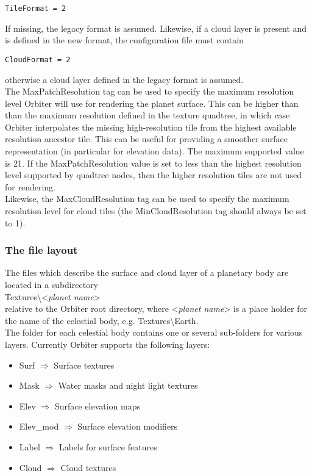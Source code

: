 \documentclass[Orbiter Developer Manual.tex]{subfiles}
\begin{document}
\begin{lstlisting}[language=OSFS]
TileFormat = 2
\end{lstlisting}

\noindent
If missing, the legacy format is assumed. Likewise, if a cloud layer is present and is defined in the new format, the configuration file must contain

\begin{lstlisting}[language=OSFS]
CloudFormat = 2
\end{lstlisting}

\noindent
otherwise a cloud layer defined in the legacy format is assumed.\\
The MaxPatchResolution tag can be used to specify the maximum resolution level Orbiter will use for rendering the planet surface. This can be higher than than the maximum resolution defined in the texture quadtree, in which case Orbiter interpolates the missing high-resolution tile from the highest available resolution ancestor tile. This can be useful for providing a smoother surface representation (in particular for elevation data). The maximum supported value is 21. If the MaxPatchResolution value is set to less than the highest resolution level supported by quadtree nodes, then the higher resolution tiles are not used for rendering.\\
Likewise, the MaxCloudResolution tag can be used to specify the maximum resolution level for cloud tiles (the MinCloudResolution tag should always be set to 1).


\subsubsection{The file layout}
\label{sssec:tile_file_layout}
The files which describe the surface and cloud layer of a planetary body are located in a subdirectory\\
\indent Textures\textbackslash <\textit{planet name}>\\
relative to the Orbiter root directory, where <\textit{planet name}> is a place holder for the name of the celestial body, e.g. Textures\textbackslash Earth.\\
The folder for each celestial body contains one or several sub-folders for various layers. Currently Orbiter supports the following layers:

\begin{itemize}
\item Surf $\Rightarrow$ Surface textures
\item Mask $\Rightarrow$ Water masks and night light textures
\item Elev $\Rightarrow$ Surface elevation maps
\item Elev\_mod $\Rightarrow$ Surface elevation modifiers
\item Label $\Rightarrow$ Labels for surface features
\item Cloud $\Rightarrow$ Cloud textures
\end{itemize}
\end{document}
